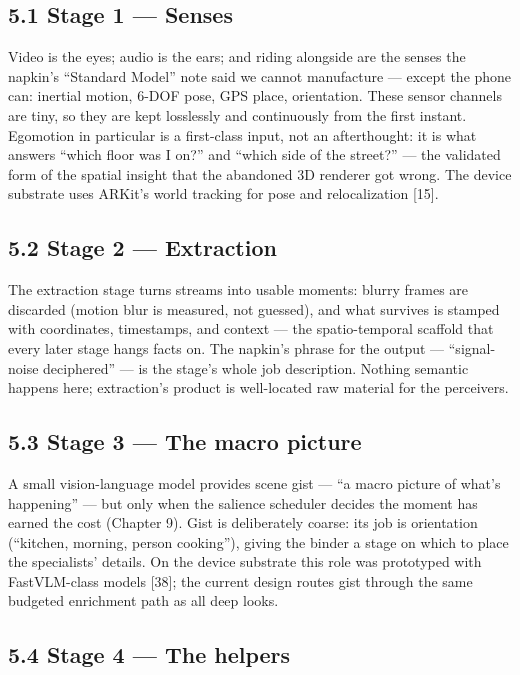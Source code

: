 \subsection{5.1 Stage 1 --- Senses}\label{stage-1-senses}

Video is the eyes; audio is the ears; and riding alongside are the senses the napkin's ``Standard Model'' note said we cannot manufacture --- except the phone can: inertial motion, 6-DOF pose, GPS place, orientation. These sensor channels are tiny, so they are kept losslessly and continuously from the first instant. Egomotion in particular is a first-class input, not an afterthought: it is what answers ``which floor was I on?'' and ``which side of the street?'' --- the validated form of the spatial insight that the abandoned 3D renderer got wrong. The device substrate uses ARKit's world tracking for pose and relocalization {[}15{]}.

\subsection{5.2 Stage 2 --- Extraction}\label{stage-2-extraction}

The extraction stage turns streams into usable moments: blurry frames are discarded (motion blur is measured, not guessed), and what survives is stamped with coordinates, timestamps, and context --- the spatio-temporal scaffold that every later stage hangs facts on. The napkin's phrase for the output --- ``signal-noise deciphered'' --- is the stage's whole job description. Nothing semantic happens here; extraction's product is well-located raw material for the perceivers.

\subsection{5.3 Stage 3 --- The macro picture}\label{stage-3-the-macro-picture}

A small vision-language model provides scene gist --- ``a macro picture of what's happening'' --- but only when the salience scheduler decides the moment has earned the cost (Chapter 9). Gist is deliberately coarse: its job is orientation (``kitchen, morning, person cooking''), giving the binder a stage on which to place the specialists' details. On the device substrate this role was prototyped with FastVLM-class models {[}38{]}; the current design routes gist through the same budgeted enrichment path as all deep looks.

\subsection{5.4 Stage 4 --- The helpers}\label{stage-4-the-helpers}

